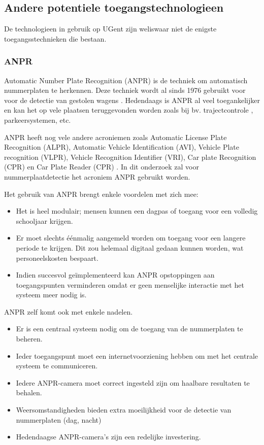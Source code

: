 \subsection{Andere potentiele toegangstechnologieen}
De technologieen in gebruik op UGent zijn weliswaar niet de enigste toegangsstechnieken die bestaan.

\subsubsection{ANPR}
Automatic Number Plate Recognition (ANPR) is de techniek om automatisch nummerplaten te herkennen. Deze techniek wordt al sinds 1976 gebruikt voor voor de detectie van gestolen wagens \autocite{uk2011anpr}. Hedendaags is ANPR al veel toegankelijker en kan het op vele plaatsen teruggevonden worden zoals bij bv. trajectcontrole \autocite{de2014snelheidscamera}, parkeersystemen, etc.
\par
ANPR heeft nog vele andere acroniemen zoals Automatic License Plate Recognition (ALPR), Automatic Vehicle Identification (AVI), Vehicle Plate recognition (VLPR), Vehicle Recognition Identifier (VRI), Car plate Recognition (CPR) en Car Plate Reader (CPR) \autocite{axis2019license}. In dit onderzoek zal voor nummerplaatdetectie het acroniem ANPR gebruikt worden.
\par
Het gebruik van ANPR brengt enkele voordelen met zich mee:
\begin{itemize}
	\item Het is heel modulair; mensen kunnen een dagpas of toegang voor een volledig schooljaar krijgen.
	\item Er moet slechts éénmalig aangemeld worden om toegang voor een langere periode te krijgen. Dit zou helemaal digitaal gedaan kunnen worden, wat personeelskosten bespaart.
	\item Indien succesvol geïmplementeerd kan ANPR opstoppingen aan toegangspunten verminderen omdat er geen menselijke interactie met het systeem meer nodig is.
\end{itemize}
\par
ANPR zelf komt ook met enkele nadelen.
\begin{itemize}
	\item Er is een centraal systeem nodig om de toegang van de nummerplaten te beheren.
	\item Ieder toegangspunt moet een internetvoorziening hebben om met het centrale systeem te communiceren.
	\item Iedere ANPR-camera moet correct ingesteld zijn om haalbare resultaten te behalen.
	\item Weersomstandigheden bieden extra moeilijkheid voor de detectie van nummerplaten (dag, nacht)
	\item Hedendaagse ANPR-camera's zijn een redelijke investering.
\end{itemize}
